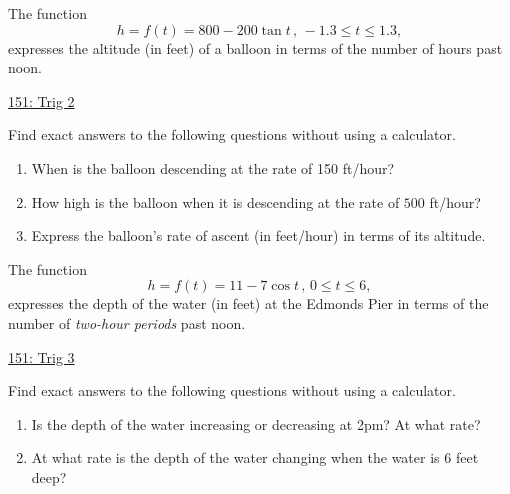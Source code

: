 \documentclass{ximera}
\begin{document}
\begin{question}  \label{Q:LKJMFJUFegvt4}
The function
\[
       h = f(t) = 800 - 200 \tan t \, , \, -1.3\leq t\leq 1.3,
\]
expresses the altitude (in feet) of a balloon in terms of the number of hours past noon.

\begin{onlineOnly}
    \begin{center}
\end{center}
\end{onlineOnly}

\href{https://www.desmos.com/calculator/re6nqofgs0}{151: Trig 2}

Find exact answers to the following questions without using a calculator.


\begin{enumerate}
\item When is the balloon descending at the rate of 150 ft/hour?

\item How high is the balloon when it is descending at the rate of $500$ ft/hour?

\item Express the balloon's rate of ascent (in feet/hour) in terms of its altitude.

\end{enumerate}

\end{question}


\begin{question}  \label{Qghghgfdgdsfg0900}

The function
\[
       h = f(t) = 11 - 7 \cos t\, , \, 0\leq t \leq 6 ,
\]
expresses the depth of the water (in feet) at the Edmonds Pier in terms of the number of \emph{two-hour periods} past noon.

\begin{onlineOnly}
    \begin{center}
\end{center}
\end{onlineOnly}

\href{https://www.desmos.com/calculator/4bh7kimi7f}{151: Trig 3}

Find exact answers to the following questions without using a calculator.


\begin{enumerate}
\item Is the depth of the water increasing or decreasing at 2pm? At what rate?

\item At what rate is the depth of the water changing when the water is $6$ feet deep? 

\end{enumerate}
\end{question}
\end{document}
